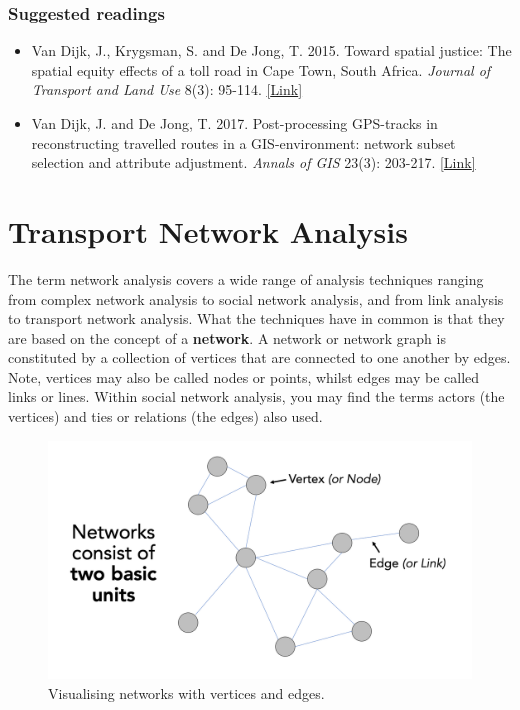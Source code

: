 \documentclass[
]{book}
\providecommand{\tightlist}{%
  \setlength{\itemsep}{0pt}\setlength{\parskip}{0pt}}
\begin{document}
\hypertarget{suggested-readings-9}{%
\subsubsection*{Suggested readings}\label{suggested-readings-9}}

\begin{itemize}
\tightlist
\item
  Van Dijk, J., Krygsman, S. and De Jong, T. 2015. Toward spatial justice: The spatial equity effects of a toll road in Cape Town, South Africa. \emph{Journal of Transport and Land Use} 8(3): 95-114. \href{https://doi.org/10.5198/jtlu.2015.555}{{[}Link{]}}
\item
  Van Dijk, J. and De Jong, T. 2017. Post-processing GPS-tracks in reconstructing travelled routes in a GIS-environment: network subset selection and attribute adjustment. \emph{Annals of GIS} 23(3): 203-217. \href{https://doi.org/10.1080/19475683.2017.1340340}{{[}Link{]}}
\end{itemize}

\hypertarget{transport-network-analysis-1}{%
\section{Transport Network Analysis}\label{transport-network-analysis-1}}

The term network analysis covers a wide range of analysis techniques ranging from complex network analysis to social network analysis, and from link analysis to transport network analysis. What the techniques have in common is that they are based on the concept of a \textbf{network}. A network or network graph is constituted by a collection of vertices that are connected to one another by edges. Note, vertices may also be called nodes or points, whilst edges may be called links or lines. Within social network analysis, you may find the terms actors (the vertices) and ties or relations (the edges) also used.

\begin{figure}

{\centering \includegraphics[width=17.78in]{images/w10/network-graph} 

}

\caption{Visualising networks with vertices and edges.}\label{fig:network-graph-picca}
\end{figure}
\end{document}
